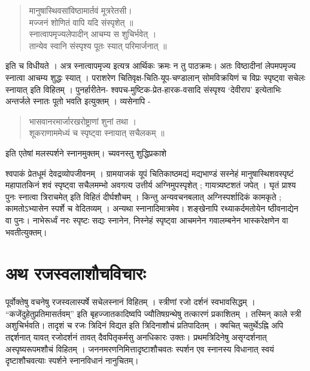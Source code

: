 \begin{verse}
मानुषास्थिवसांविष्ठामार्तवं मूत्ररेतसी। \\
मज्जनं शोणितं वापि यदि संस्पृशेत् ॥ \\
स्नात्वापमृज्यलेपादीन् आचम्य स शुचिर्भवेत् ।\\ 
तान्येव स्वानि संस्पृश्य पूतः स्यात् परिमार्जनात् ॥
\end{verse}
इति च विधीयते । अत्र स्नात्वापमृज्य इत्यत्र आर्थिकः क्रमः न तु पाठक्रमः। अतः विष्ठादीनां लेपमपमृज्य स्नात्वा आचम्य शुद्धः स्यात् । पराशरेण चितिवृक्ष-चिति-यूप-चण्डालान् सोमविक्रयिणं च विप्रः स्पृष्ट्वा सचेलः स्नायात् इति विहितम् । पुनर्हारीतेन- श्वपच-मुष्टिक-प्रेत-हारक-वसादि संस्पृश्य ‘देवीराप’ इत्येताभिः अन्तर्जले स्नातः पूतो भवति इत्युक्तम् । व्यसेनापि - 
\begin{verse}
भासवानरमार्जारखरोष्ट्राणां शुनां तथा ।\\
शूकराणाममेध्यं च स्पृष्ट्वा स्नायात् सचैलकम् ॥  
\end{verse}
इति एतेषां मलस्पर्शने स्नानमुक्तम्। च्यवनस्तु शुद्धिप्रकाशे 

श्वपाकं प्रेतधूमं देवद्रव्योपजीवनम् । ग्रामयाजकं यूपं चितिकाष्ठमद्यं मद्यभाण्डं सस्नेहं मानुषास्थिशवस्पृष्टं महापातकिनं शवं स्पृष्ट्वा सचैलमम्भो अवगत्य उत्तीर्य अग्निमुपस्पृशेत् ; गायत्र्यष्टशतं जपेत् । घृतं प्राश्य पुनः स्नात्वा त्रिराचमेत् इति विहितं दीर्घशौचम् । किन्तु अन्यवचनबलात् अग्निस्पर्शादिकं कामकृते ; कामतोऽभ्यासेन स्पर्शे च वेदितव्यम् । अन्यथा स्नानादिमात्रमेव। शङ्खेनापि रथ्याकर्दमतोयेन ष्ठीवनाद्येन वा पुनः। नाभेरूर्ध्वं नरः स्पृष्टः सद्यः स्नानेन, निस्नेहं स्पृष्ट्वा आचमनेन गवालम्बनेन भास्करेक्षणेन वा भवतीत्युक्तम्।

\section*{अथ रजस्वलाशौचविचारः}

पूर्वोक्तेषु वचनेषु रजस्वलास्पर्षे सचेलस्नानं विहितम् । स्त्रीणां रजो दर्शनं स्वभावसिद्धम् । “कजेंदुहेतुप्रतिमासर्तवम्” इति बृहज्जातकादिष्वपि ज्यौतिषग्रन्थेषु तत्कारणं प्रकाशितम् । तस्मिन् काले स्त्री अशुचिर्भवति। तादृशं च रजः त्रिदिनं विद्यत इति त्रिदिनाशौचं प्रतिपादितम् । क्वचित् चतुर्थेऽह्नि अपि तद्दर्शनात् यावत् रजोदर्शनं तावत् दैवपितृकर्मसु अनधिकारः उक्तः। प्रथमत्रिदिनेषु असृग्दर्शनात् अस्पृष्यरूपमशौचं विहितम् । जननमरणनिमित्तादृष्टाशौचवतः स्पर्शन एव स्नानस्य विधानात् स्वयं दृष्टाशौचवत्याः स्पर्शने स्नानविधानं नानुचितम्।


